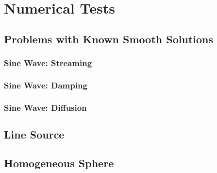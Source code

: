 \section{Numerical Tests}
\label{sec:numerical}

\subsection{Problems with Known Smooth Solutions}

\subsubsection{Sine Wave: Streaming}

\subsubsection{Sine Wave: Damping}

\subsubsection{Sine Wave: Diffusion}

\subsection{Line Source}

\subsection{Homogeneous Sphere}